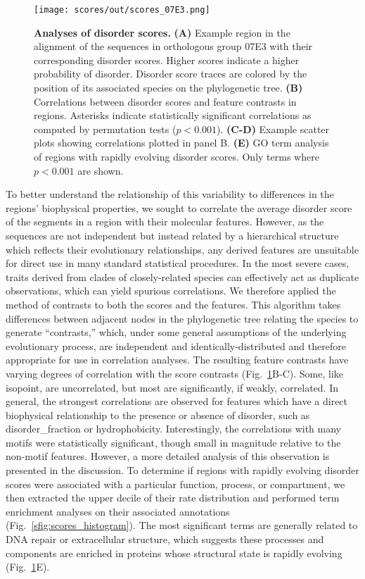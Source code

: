 \begin{figure}[h!]
\texttt{[image: scores/out/scores\_07E3.png]}
\centering
\caption{\textbf{Analyses of disorder scores.}
\textbf{(A)} Example region in the alignment of the sequences in orthologous group 07E3 with their corresponding disorder scores. Higher scores indicate a higher probability of disorder. Disorder score traces are colored by the position of its associated species on the phylogenetic tree. \textbf{(B)} Correlations between disorder scores and feature contrasts in regions. Asterisks indicate statistically significant correlations as computed by permutation tests ($p < 0.001$). \textbf{(C-D)} Example scatter plots showing correlations plotted in panel B. \textbf{(E)} GO term analysis of regions with rapidly evolving disorder scores. Only terms where $p < 0.001$ are shown.}
\label{fig:scores}
\end{figure}

To better understand the relationship of this variability to differences in the regions' biophysical properties, we sought to correlate the average disorder score of the segments in a region with their molecular features. However, as the sequences are not independent but instead related by a hierarchical structure which reflects their evolutionary relationships, any derived features are unsuitable for direct use in many standard statistical procedures. In the most severe cases, traits derived from clades of closely-related species can effectively act as duplicate observations, which can yield spurious correlations. We therefore applied the method of contrasts to both the scores and the features. This algorithm takes differences between adjacent nodes in the phylogenetic tree relating the species to generate ``contrasts,'' which, under some general assumptions of the underlying evolutionary process, are independent and identically-distributed and therefore appropriate for use in correlation analyses. The resulting feature contrasts have varying degrees of correlation with the score contrasts (Fig.~\ref{fig:scores}B-C). Some, like isopoint, are uncorrelated, but most are significantly, if weakly, correlated. In general, the strongest correlations are observed for features which have a direct biophysical relationship to the presence or absence of disorder, such as disorder\_fraction or hydrophobicity. Interestingly, the correlations with many motifs were statistically significant, though small in magnitude relative to the non-motif features. However, a more detailed analysis of this observation is presented in the discussion. To determine if regions with rapidly evolving disorder scores were associated with a particular function, process, or compartment, we then extracted the upper decile of their rate distribution and performed term enrichment analyses on their associated annotations (Fig.~\ref{sfig:scores_histogram}). The most significant terms are generally related to DNA repair or extracellular structure, which suggests these processes and components are enriched in proteins whose structural state is rapidly evolving (Fig.~\ref{fig:scores}E).

